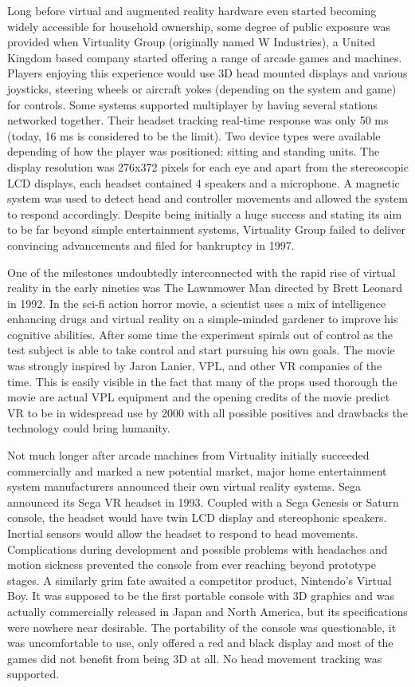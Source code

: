 \documentclass[12pt, a4paper]{article}
\begin{document}
Long before virtual and augmented reality hardware even started becoming widely accessible for household ownership, some degree of public exposure was provided when Virtuality Group (originally named W Industries), a United Kingdom based company started offering a range of arcade games and machines. Players enjoying this experience would use 3D head mounted displays and various joysticks, steering wheels or aircraft yokes (depending on the system and game) for controls. Some systems supported multiplayer by having several stations networked together. Their headset tracking real-time response was only 50 ms (today, 16 ms is considered to be the limit). Two device types were available depending of how the player was positioned: sitting and standing units. The display resolution was 276x372 pixels for each eye and apart from the stereoscopic LCD displays, each headset contained 4 speakers and a microphone. A magnetic system was used to detect head and controller movements and allowed the system to respond accordingly. Despite being initially a huge success and stating its aim to be far beyond simple entertainment systems, Virtuality Group failed to deliver convincing advancements and filed for bankruptcy in 1997.


One of the milestones undoubtedly interconnected with the rapid rise of virtual reality in the early nineties was The Lawnmower Man directed by Brett Leonard in 1992. In the sci-fi action horror movie, a scientist uses a mix of intelligence enhancing drugs and virtual reality on a simple-minded gardener to improve his cognitive abilities. After some time the experiment spirals out of control as the test subject is able to take control and start pursuing his own goals. The movie was strongly inspired by Jaron Lanier, VPL, and other VR companies of the time. This is easily visible in the fact that many of the props used thorough the movie are actual VPL equipment and the opening credits of the movie predict VR to be in widespread use by 2000 with all possible positives and drawbacks the technology could bring humanity.

Not much longer after arcade machines from Virtuality initially succeeded commercially and marked a new potential market, major home entertainment system manufacturers announced their own virtual reality systems. Sega announced its Sega VR headset in 1993. Coupled with a Sega Genesis or Saturn console, the headset would have twin LCD display and stereophonic speakers. Inertial sensors would allow the headset to respond to head movements. Complications during development and possible problems with headaches and motion sickness prevented the console from ever reaching beyond prototype stages. A similarly grim fate awaited a competitor product, Nintendo’s Virtual Boy. It was supposed to be the first portable console with 3D graphics and was actually commercially released in Japan and North America, but its specifications were nowhere near desirable. The portability of the console was questionable, it was uncomfortable to use, only offered a red and black display and most of the games did not benefit from being 3D at all. No head movement tracking was supported.
\end{document}
